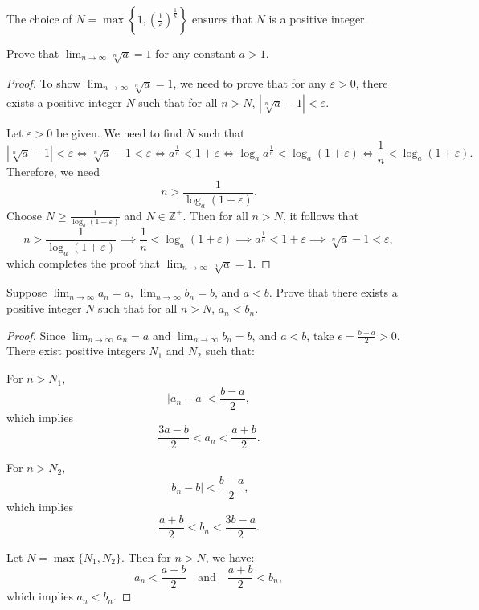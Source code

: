 \begin{remark}
The choice of $N = \max\left\{1,  \left(\frac{1}{\varepsilon}\right)^{\frac{1}{k}}  \right\}$ ensures that $N$ is a positive integer.
\end{remark}
%
\begin{exercise}
Prove that $\lim_{n \to \infty} \sqrt[n]{a} = 1$ for any constant $a > 1$.
\end{exercise}
\begin{proof}
To show $\lim_{n \to \infty} \sqrt[n]{a} = 1$, we need to prove that for any $\varepsilon > 0$, there exists a positive integer $N$ such that for all $n > N$, $\left|\sqrt[n]{a} - 1\right| < \varepsilon$.

Let $\varepsilon > 0$ be given. We need to find $N$ such that
\[
\left|\sqrt[n]{a} - 1\right| < \varepsilon \iff \sqrt[n]{a} - 1 < \varepsilon \iff a^{\frac{1}{n}} < 1 + \varepsilon \iff \log_{a} a^{\frac{1}{n}} < \log_{a}(1 + \varepsilon) \iff \frac{1}{n} < \log_{a}(1 + \varepsilon).
\]
Therefore, we need
\[
n > \frac{1}{\log_{a}(1 + \varepsilon)}.
\]
Choose \(N \geq \frac{1}{\log_{a}(1 + \varepsilon)}\) and \(N \in \mathbb{Z}^+\). Then for all \(n > N\), it follows that
\[
n > \frac{1}{\log_{a}(1 + \varepsilon)} \implies \frac{1}{n} < \log_{a}(1 + \varepsilon) \implies a^{\frac{1}{n}} < 1 + \varepsilon \implies \sqrt[n]{a} - 1 < \varepsilon,
\]
which completes the proof that $\lim_{n \to \infty} \sqrt[n]{a} = 1$.
\end{proof}
%

\begin{exercise}
    Suppose \(\lim_{n \to \infty} a_n = a\), \(\lim_{n \to \infty} b_n = b\), and \(a < b\). Prove that there exists a positive integer \(N\) such that for all \(n > N\), \(a_n < b_n\).
\end{exercise}
\begin{proof}
    Since \(\lim_{n \to \infty} a_n = a\) and \(\lim_{n \to \infty} b_n = b\), and \(a < b\), take \(\epsilon = \frac{b - a}{2} > 0\). There exist positive integers \(N_1\) and \(N_2\) such that:
    
    For \(n > N_1\),
    \[
    |a_n - a| < \frac{b - a}{2},
    \]
    which implies
    \[
    \frac{3a - b}{2} < a_n < \frac{a + b}{2}.
    \]
    
    For \(n > N_2\),
    \[
    |b_n - b| < \frac{b - a}{2},
    \]
    which implies
    \[
    \frac{a + b}{2} < b_n < \frac{3b - a}{2}.
    \]
    
    Let \(N = \max\{N_1, N_2\}\). Then for \(n > N\), we have:
    \[
    a_n < \frac{a + b}{2} \quad \text{and} \quad \frac{a + b}{2} < b_n,
    \]
    which implies \(a_n < b_n\).
\end{proof}


